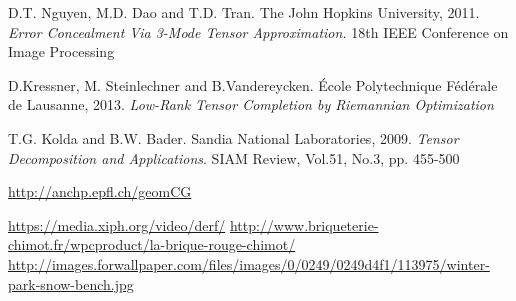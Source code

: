 \documentclass[a4paper, 11pt]{article} %
\begin{document}
\break
\begin{thebibliography}{9}

D.T. Nguyen, M.D. Dao and T.D. Tran. {The John Hopkins University}, 2011.
\textit{Error Concealment Via 3-Mode Tensor Approximation.} 18th IEEE Conference on Image Processing


D.Kressner, M. Steinlechner and B.Vandereycken.{ \'Ecole Polytechnique F\'ed\'erale de Lausanne}, 2013. \textit{Low-Rank Tensor Completion by Riemannian Optimization}


  T.G. Kolda and B.W. Bader. {Sandia National Laboratories}, 2009.
\textit{Tensor Decomposition and Applications}. SIAM Review, Vol.51, No.3, pp. 455-500

 \url{http://anchp.epfl.ch/geomCG}

 \url{https://media.xiph.org/video/derf/}
 \url{http://www.briqueterie-chimot.fr/wpcproduct/la-brique-rouge-chimot/}
 \url{http://images.forwallpaper.com/files/images/0/0249/0249d4f1/113975/winter-park-snow-bench.jpg}
\end{thebibliography}

%
%
%
\end{document}
